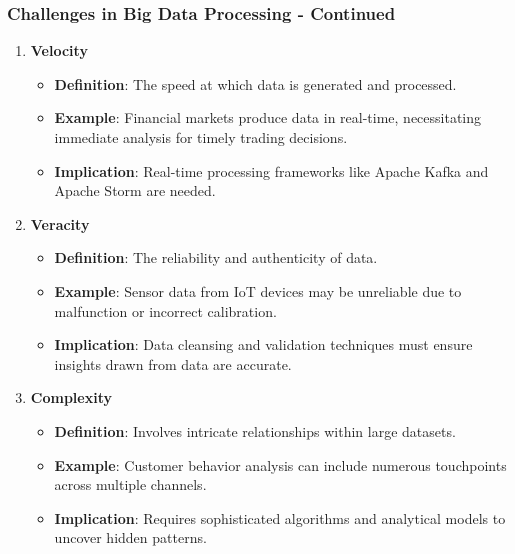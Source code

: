 \documentclass[aspectratio=169]{beamer}
\begin{document}
\begin{frame}[fragile]
    \frametitle{Challenges in Big Data Processing - Continued}
    \begin{enumerate}[resume]
        \item \textbf{Velocity}
            \begin{itemize}
                \item \textbf{Definition}: The speed at which data is generated and processed.
                \item \textbf{Example}: Financial markets produce data in real-time, necessitating immediate analysis for timely trading decisions.
                \item \textbf{Implication}: Real-time processing frameworks like Apache Kafka and Apache Storm are needed.
            \end{itemize}
        \item \textbf{Veracity}
            \begin{itemize}
                \item \textbf{Definition}: The reliability and authenticity of data.
                \item \textbf{Example}: Sensor data from IoT devices may be unreliable due to malfunction or incorrect calibration.
                \item \textbf{Implication}: Data cleansing and validation techniques must ensure insights drawn from data are accurate.
            \end{itemize}
        \item \textbf{Complexity}
            \begin{itemize}
                \item \textbf{Definition}: Involves intricate relationships within large datasets.
                \item \textbf{Example}: Customer behavior analysis can include numerous touchpoints across multiple channels.
                \item \textbf{Implication}: Requires sophisticated algorithms and analytical models to uncover hidden patterns.
            \end{itemize}
    \end{enumerate}
\end{frame}
\end{document}
